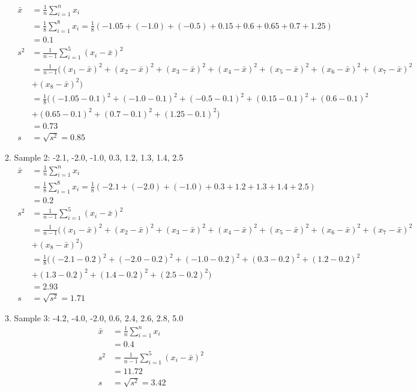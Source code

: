\documentclass[11pt]{article}\usepackage[]{graphicx}\usepackage[]{color}
\begin{document}
\begin{itemize}
\begin{enumerate}
	\begin{align*}
	\bar{x} &= \frac{1}{n}\sum_{i=1}^{n}x_i\\
			&= \frac{1}{8}\sum_{i=1}^{8}x_i= \frac{1}{8} (-1.05 + (-1.0)+ (-0.5) + 0.15 + 0.6 + 0.65+ 0.7+ 1.25) \\
			&= 0.1\\
	s^2 &= \frac{1}{n-1}\sum_{i=1}^5 (x_i - \bar{x})^2 \\
		&= \frac{1}{n-1}( (x_1 - \bar{x})^2 + (x_2 - \bar{x})^2 + (x_3 - \bar{x})^2 + (x_4 - \bar{x})^2 + (x_5 - \bar{x})^2+ (x_6 - \bar{x})^2+ (x_7 - \bar{x})^2\\
		&+ (x_8 - \bar{x})^2  )\\
		&= \frac{1}{8}( (-1.05 -0.1)^2 + (-1.0 - 0.1)^2+ (-0.5 - 0.1)^2+ (0.15 - 0.1)^2+ (0.6 - 0.1)^2\\
		&+ (0.65 - 0.1)^2+ (0.7 - 0.1)^2+ (1.25 - 0.1)^2  )\\
		&= 0.73\\
	s&= \sqrt{s^2}= 0.85
	\end{align*}
	
	\item Sample 2: -2.1, -2.0, -1.0, 0.3, 1.2, 1.3, 1.4, 2.5\\
		\begin{align*}
	\bar{x} &= \frac{1}{n}\sum_{i=1}^{n}x_i\\
	&= \frac{1}{8}\sum_{i=1}^{8}x_i= \frac{1}{8} (-2.1+ (-2.0)+ (-1.0)+ 0.3+ 1.2+ 1.3+ 1.4+ 2.5) \\
	&= 0.2\\
	s^2 &= \frac{1}{n-1}\sum_{i=1}^5 (x_i - \bar{x})^2 \\
	&= \frac{1}{n-1}( (x_1 - \bar{x})^2 + (x_2 - \bar{x})^2 + (x_3 - \bar{x})^2 + (x_4 - \bar{x})^2 + (x_5 - \bar{x})^2+ (x_6 - \bar{x})^2+ (x_7 - \bar{x})^2\\
	&+ (x_8 - \bar{x})^2  )\\
	&= \frac{1}{8}( (-2.1 -0.2)^2 + ( -2.0 - 0.2)^2+ (-1.0 - 0.2)^2+ (0.3 - 0.2)^2+ (1.2 - 0.2)^2\\
	&+ (1.3 - 0.2)^2+ (1.4 - 0.2)^2+ (2.5 - 0.2)^2  )\\
	&= 2.93\\
	s&= \sqrt{s^2}= 1.71
	\end{align*}
	
	\item Sample 3: -4.2, -4.0, -2.0, 0.6, 2.4, 2.6, 2.8, 5.0\\
    \begin{align*}
	\bar{x} &= \frac{1}{n}\sum_{i=1}^{n}x_i\\
	&=  0.4\\
	s^2 &= \frac{1}{n-1}\sum_{i=1}^5 (x_i - \bar{x})^2 \\
	&= 11.72\\
	s&= \sqrt{s^2}= 3.42
	\end{align*}
	

\end{enumerate}
\end{itemize}
\end{document}
